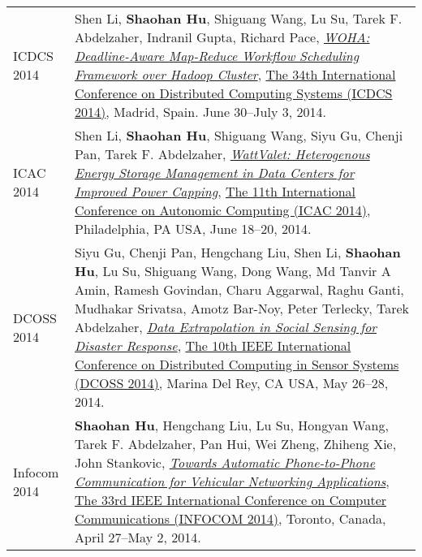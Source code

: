 \begin{longtabu}{p{.51\sectionwidth} p{.78\resumewidth}}
{\sc ICDCS 2014}\hypertarget{li2014icdcs}{} &
Shen Li, \textbf{Shaohan Hu}, Shiguang Wang, Lu Su, Tarek F. Abdelzaher, Indranil Gupta, Richard Pace,
\href{http://ieeexplore.ieee.org/document/6888886}{\emph{WOHA: Deadline-Aware Map-Reduce Workflow Scheduling Framework over Hadoop Cluster}},
\href{http://lsd.ls.fi.upm.es/icdcs2014}{\textsf{The 34th International Conference on Distributed Computing Systems (ICDCS 2014)}},
Madrid, Spain. June 30--July 3, 2014. \\

{\sc ICAC 2014}\hypertarget{li2014icac}{} &
Shen Li, \textbf{Shaohan Hu}, Shiguang Wang, Siyu Gu, Chenji Pan, Tarek F. Abdelzaher,
\href{https://www.usenix.org/system/files/conference/icac14/icac14-paper-li_shen.pdf}{\emph{WattValet: Heterogenous Energy Storage Management in Data Centers for Improved Power Capping}},
\href{https://www.usenix.org/conference/icac14}{\textsf{The 11th International Conference on Autonomic Computing (ICAC 2014)}},
Philadelphia, PA USA, June 18--20, 2014. \\

{\sc DCOSS 2014}\hypertarget{gu2014dcoss}{} &
Siyu Gu, Chenji Pan, Hengchang Liu, Shen Li, \textbf{Shaohan Hu}, Lu Su, Shiguang Wang, Dong Wang, Md Tanvir A Amin, Ramesh Govindan, Charu Aggarwal, Raghu Ganti, Mudhakar Srivatsa, Amotz Bar-Noy, Peter Terlecky, Tarek Abdelzaher,
\href{http://ieeexplore.ieee.org/document/6846153}{\emph{Data Extrapolation in Social Sensing for Disaster Response}},
\href{http://www.dcoss.org/dcoss14/}{\textsf{The 10th IEEE International Conference on Distributed Computing in Sensor Systems (DCOSS 2014)}},
Marina Del Rey, CA USA, May 26--28, 2014. \\


{\sc Infocom 2014}\hypertarget{hu2014infocom}{} &
\textbf{Shaohan Hu}, Hengchang Liu, Lu Su, Hongyan Wang, Tarek F. Abdelzaher, Pan Hui, Wei Zheng, Zhiheng Xie, John Stankovic,
\href{http://ieeexplore.ieee.org/document/6848113}{\emph{Towards Automatic Phone-to-Phone Communication for Vehicular Networking Applications}},
\href{http://infocom2014.ieee-infocom.org}{\textsf{The 33rd IEEE International Conference on Computer Communications (INFOCOM 2014)}},
Toronto, Canada, April 27--May 2, 2014. \\


\end{longtabu}
